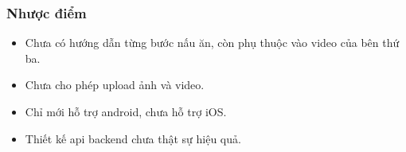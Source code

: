         \subsubsection{Nhược điểm}
        \begin{itemize}
            \item Chưa có hướng dẫn từng bước nấu ăn, còn phụ thuộc vào video của bên thứ ba.
            \item Chưa cho phép upload ảnh và video.
            \item Chỉ mới hỗ trợ android, chưa hỗ trợ iOS.
            \item Thiết kế api backend chưa thật sự hiệu quả.
        \end{itemize}